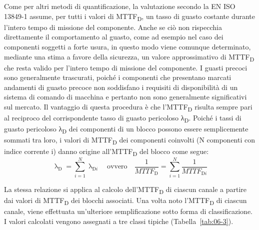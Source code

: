 Come per altri metodi di quantificazione, la valutazione secondo la EN ISO 13849-1 assume, per tutti i valori di MTTF\textsubscript{D}, un tasso di guasto costante durante l'intero tempo di missione del componente. Anche se ciò non rispecchia direttamente il comportamento al guasto, come ad esempio nel caso dei componenti soggetti a forte usura, in questo modo viene comunque determinato, mediante una stima a favore della sicurezza, un valore approssimativo di MTTF\textsubscript{D} che resta valido per l'intero tempo di missione del componente. I guasti precoci sono generalmente trascurati, poiché i componenti che presentano marcati andamenti di guasto precoce non soddisfano i requisiti di disponibilità di un sistema di comando di macchina e pertanto non sono generalmente significativi sul mercato. Il vantaggio di questa procedura è che l'MTTF\textsubscript{D} risulta sempre pari al reciproco del corrispondente tasso di guasto pericoloso λ\textsubscript{D}. Poiché i tassi di guasto pericoloso λ\textsubscript{D} dei componenti di un blocco possono essere semplicemente sommati tra loro, i valori di MTTF\textsubscript{D} dei componenti coinvolti (N componenti con indice corrente i) danno origine all'MTTF\textsubscript{D} del blocco come segue:
\begin{equation}
    \uplambda_{\mathrm{D}} = \sum_{i=1}^{N} \uplambda_{\mathrm{D}i}
    \quad\text{ovvero}\quad
    \frac{1}{\textit{MTTF}_{\mathrm{D}}} = \sum_{i=1}^{N} \frac{1}{\textit{MTTF}_{\mathrm{D}i}}
    \label{eq:06-01}
\end{equation}

La stessa relazione si applica al calcolo dell'MTTF\textsubscript{D} di ciascun canale a partire dai valori di MTTF\textsubscript{D} dei blocchi associati. Una volta noto l'MTTF\textsubscript{D} di ciascun canale, viene effettuata un'ulteriore semplificazione sotto forma di classificazione. I valori calcolati vengono assegnati a tre classi tipiche (Tabella~\ref{tab:06-3}).

